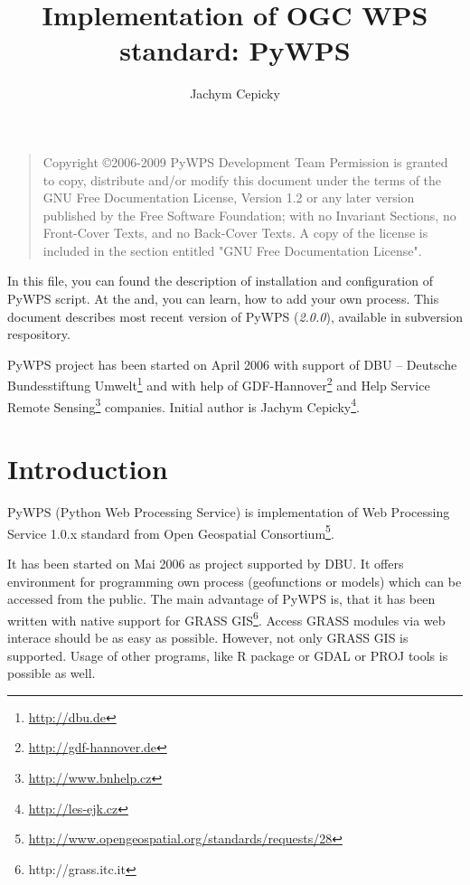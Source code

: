 \documentclass[a4paper,11pt]{article}
\author{Jachym Cepicky}
\title{Implementation of OGC WPS standard: PyWPS}
\newcommand{\version}{\emph{2.0.0}}
\begin{document}
\maketitle{}

\bigskip
\begin{quote}
    Copyright \copyright  2006-2009 PyWPS Development Team
    Permission is granted to copy, distribute and/or modify this document
    under the terms of the GNU Free Documentation License, Version 1.2
    or any later version published by the Free Software Foundation;
    with no Invariant Sections, no Front-Cover Texts, and no Back-Cover Texts.
    A copy of the license is included in the section entitled "GNU
    Free Documentation License".
\end{quote}
\bigskip


In this file, you can found the description of installation and
configuration of PyWPS script. At the and, you can learn, how to add
your own process. This document describes most recent
version of PyWPS (\version), available in subversion respository.

PyWPS project has been started on April 2006 with support of DBU --
Deutsche Bundesstiftung Umwelt\footnote{\url{http://dbu.de}} and with help of
GDF-Hannover\footnote{\url{http://gdf-hannover.de}} and Help Service Remote
Sensing\footnote{\url{http://www.bnhelp.cz}} companies. Initial author is Jachym
Cepicky\footnote{\url{http://les-ejk.cz}}.
    

    \tableofcontents

\newpage

\section{Introduction}
PyWPS (Python Web Processing Service) is implementation of Web
Processing Service 1.0.x standard from Open Geospatial
Consortium\footnote{\url{http://www.opengeospatial.org/standards/requests/28}}.

It has been started on Mai 2006 as project supported by DBU. It offers
environment for programming own process (geofunctions or models) which can
be accessed from the public. The main advantage of PyWPS is, that it has
been written with native support for GRASS
GIS\footnote{http://grass.itc.it}. Access GRASS modules via web
interace should be as easy as possible.
However, not only GRASS GIS is supported. Usage of other programs, like
R package or GDAL or PROJ tools is possible as well.
\end{document}
